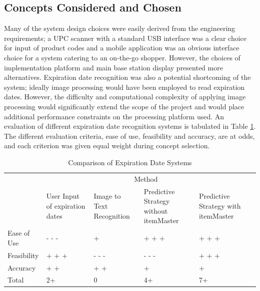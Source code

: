\documentclass[11pt]{article} %
\begin{document}
\subsection{Concepts Considered and Chosen}
Many of the system design choices were easily derived from the engineering requirements; a UPC scanner with a standard USB interface was a clear choice for input of product codes and a mobile application was an obvious interface choice for a system catering to an on-the-go shopper. However, the choices of implementation platform and main base station display presented more alternatives. Expiration date recognition was also a potential shortcoming of the system; ideally image processing would have been employed to read expiration dates. However, the difficulty and computational complexity of applying image processing would significantly extend the scope of the project and would place additional performance constraints on the processing platform used. An evaluation of different expiration date recognition systems is tabulated in Table \ref{tab:datesys}. The different evaluation criteria, ease of use, feasibility and accuracy, are at odds, and each criterion was given equal weight during concept selection.
\begin{table}[h!]
\vspace{0.5cm}
\caption{Comparison of Expiration Date Systems}
\begin{tabular}{| p{1in} | p{1.15in} | p{1.15in} | p{1.15in} | p{1.15in}  | p{1.15in} |}
\cline{2-5}
\multicolumn{1}{c}{}&\multicolumn{4}{|c|}{Method} \\
\cline{2-5}
\multicolumn{1}{c|}{}&User Input \newline of expiration \newline dates& Image to Text \newline Recognition & Predictive \newline Strategy without \newline itemMaster& Predictive \newline Strategy with \newline itemMaster \\
\hline
Ease of Use&- - -&+&+ + +&+ + +\\
\hline
Feasibility&+ + +&- - -&- - -&+ + +\\
\hline
Accuracy & + + & + + &+&+\\
\hline \hline
Total &2+ &0&4+&7+\\
\hline
\end{tabular}
\label{tab:datesys}
\end{table}
\end{document}
